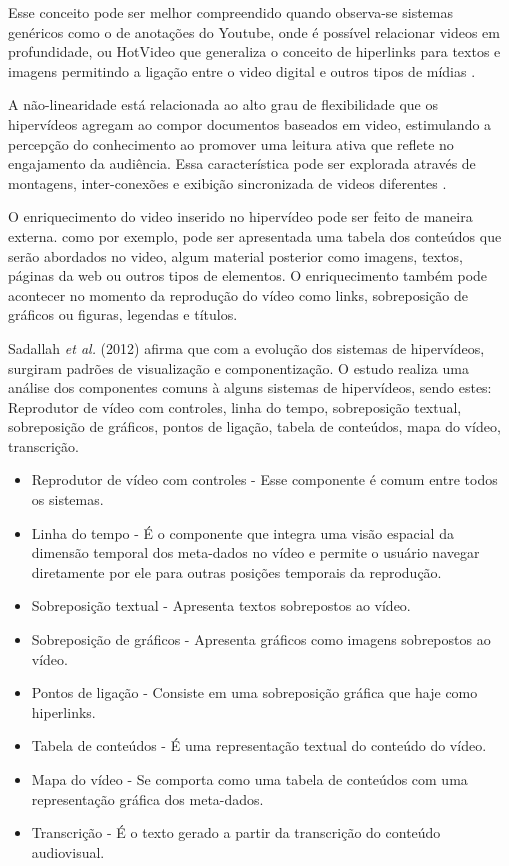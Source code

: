 Esse conceito pode ser melhor compreendido quando observa-se sistemas genéricos como o de anotações do Youtube, onde é possível relacionar videos em profundidade, ou HotVideo que generaliza o conceito de hiperlinks para textos e imagens permitindo a ligação entre o video digital e outros tipos de mídias \cite{sadallah2012, finke2004, faga2010}.

A não-linearidade está relacionada ao alto grau de flexibilidade que os hipervídeos agregam ao compor documentos baseados em video, estimulando a percepção do conhecimento ao promover uma leitura ativa que reflete no engajamento da audiência. Essa característica pode ser explorada através de montagens, inter-conexões e exibição sincronizada de videos diferentes \cite{sadallah2012}.

O enriquecimento do video inserido no hipervídeo pode ser feito de maneira externa. como por exemplo, pode ser apresentada uma tabela dos conteúdos que serão abordados no video, algum material posterior como imagens, textos, páginas da web ou outros tipos de elementos. O enriquecimento também pode acontecer no momento da reprodução do vídeo como links, sobreposição de gráficos ou figuras, legendas e títulos.

Sadallah \textit{et al.} (2012) afirma que com a evolução dos sistemas de hipervídeos, surgiram padrões de visualização e componentização. O estudo realiza uma análise dos componentes comuns à alguns sistemas de hipervídeos, sendo estes: Reprodutor de vídeo com controles, linha do tempo, sobreposição textual, sobreposição de gráficos, pontos de ligação, tabela de conteúdos, mapa do vídeo, transcrição.

\begin{itemize}
	\item Reprodutor de vídeo com controles - Esse componente é comum entre todos os sistemas.
	\item Linha do tempo - É o componente que integra uma visão espacial da dimensão temporal dos meta-dados no vídeo e permite o usuário navegar diretamente por ele para outras posições temporais da reprodução.
	\item Sobreposição textual - Apresenta textos sobrepostos ao vídeo.
	\item Sobreposição de gráficos - Apresenta gráficos como imagens sobrepostos ao vídeo.
	\item Pontos de ligação - Consiste em uma sobreposição gráfica que haje como hiperlinks.
	\item Tabela de conteúdos - É uma representação textual do conteúdo do vídeo.
	\item Mapa do vídeo - Se comporta como uma tabela de conteúdos com uma representação gráfica dos meta-dados.
	\item Transcrição - É o texto gerado a partir da transcrição do conteúdo audiovisual.
\end{itemize} 

